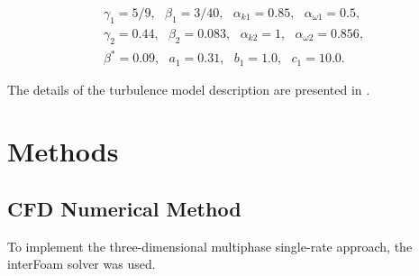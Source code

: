 \documentclass[mathematics,article,submit,pdftex,moreauthors]{Definitions/mdpi}
\begin{document}
\begin{linenomath}
\begin{equation}
	\label{kOmegaSstConstantsInit}
	\begin{aligned}
		\gamma_1 = 5 / 9,\ \ \ \beta_1 = 3 / 40,\ \ \ \alpha_{k1} = 0.85,\ \ \ \alpha_{\omega1} = 0.5,\\
		\gamma_2 = 0.44,\ \ \ \beta_2 = 0.083,\ \ \ \alpha_{k2} = 1,\ \ \ \alpha_{\omega 2} = 0.856,\\
		\beta^* = 0.09,\ \ \ a_1 = 0.31,\ \ \ b_1 = 1.0,\ \ \ c_1 = 10.0.
	\end{aligned}
\end{equation}
\end{linenomath}

The details of the turbulence model description are presented in \cite{Menter1993, MenterKuntzLangtry2003}.



 
\section{Methods}
\subsection{CFD Numerical Method}

To implement the three-dimensional multiphase single-rate approach, the interFoam \cite{Rusche2003ComputationalFD} solver was used.
\end{document}
